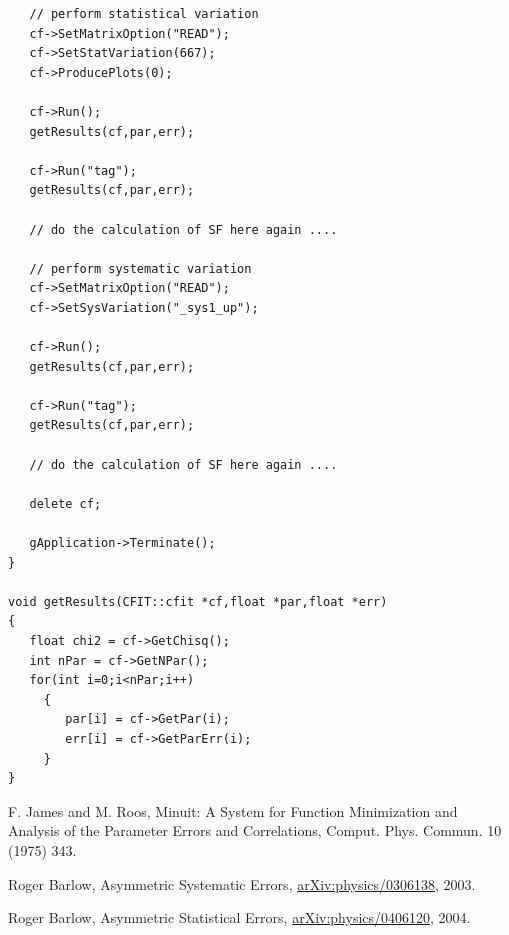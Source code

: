 \documentclass[12pt]{article}
\begin{document}
\begin{verbatim}
   // perform statistical variation
   cf->SetMatrixOption("READ");
   cf->SetStatVariation(667);
   cf->ProducePlots(0);
   
   cf->Run();
   getResults(cf,par,err);

   cf->Run("tag");
   getResults(cf,par,err);
   
   // do the calculation of SF here again ....
   
   // perform systematic variation
   cf->SetMatrixOption("READ");
   cf->SetSysVariation("_sys1_up");

   cf->Run();
   getResults(cf,par,err);

   cf->Run("tag");
   getResults(cf,par,err);
   
   // do the calculation of SF here again ....
   
   delete cf;
   
   gApplication->Terminate();
}

void getResults(CFIT::cfit *cf,float *par,float *err)
{   
   float chi2 = cf->GetChisq();
   int nPar = cf->GetNPar();
   for(int i=0;i<nPar;i++)
     {
        par[i] = cf->GetPar(i);
        err[i] = cf->GetParErr(i);	
     }
}
\end{verbatim}

\begin{thebibliography}{9}

F. James and M. Roos,
Minuit: A System for Function Minimization and Analysis of the
Parameter Errors and Correlations,
Comput. Phys. Commun. 10 (1975) 343.

Roger Barlow, 
Asymmetric Systematic Errors,
\url{arXiv:physics/0306138},
2003.

Roger Barlow,
Asymmetric Statistical Errors,
\url{arXiv:physics/0406120},
2004.

\end{thebibliography}
\end{document}
